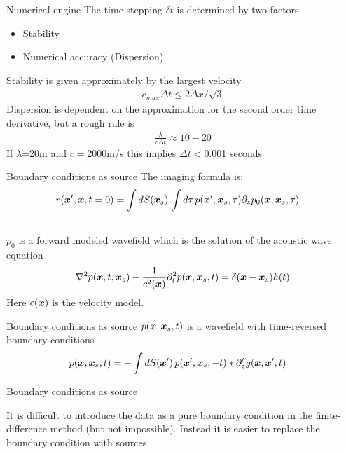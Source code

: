\documentclass[xcolor=dvipsnames,notes]{beamer}
\begin{document}
\begin{frame}{Numerical engine}
The time stepping $\delta t$ is determined by two factors
\begin{itemize}
  \item Stability
  \item Numerical accuracy (Dispersion)
\end{itemize}
Stability is given approximately by the largest velocity
\begin{eqnarray}
c_{max} \Delta t \le 2\Delta x/\sqrt{3}
\end{eqnarray}
Dispersion is dependent on the approximation for the second order time derivative,
but a rough rule is 
\begin{eqnarray}
\frac{\lambda}{c\Delta t} \approx 10-20
\end{eqnarray}
If $\lambda$=20m and $c=$2000m/s this
implies $\Delta t < $0.001 seconds
\end{frame}
\begin{frame}{Boundary conditions as source}
The imaging formula is:
\begin{eqnarray}
 r(\mbox{\boldmath $x$}',\mbox{\boldmath $x$},t=0)=
\int dS(\mbox{\boldmath $x$}_s)\, \int d\tau\, p(\mbox{\boldmath $x$}',\mbox{\boldmath $x$}_s,\tau)\partial_z p_0(\mbox{\boldmath $x$},\mbox{\boldmath $x$}_s,\tau)\nonumber\\
&&                   \label{eq:10600}
\end{eqnarray}
$p_0$ is a forward modeled wavefield which is the solution of the acoustic
wave equation
\begin{eqnarray}
\nabla^2 p(\mbox{\boldmath $x$},t,\mbox{\boldmath $x$}_s) - \frac{1}{c^2(\mbox{\boldmath $x$})} \partial^2_t p(\mbox{\boldmath $x$},\mbox{\boldmath $x$}_s,t) = \delta(\mbox{\boldmath $x$}-\mbox{\boldmath $x$}_s)h(t)
\end{eqnarray}
Here $c(\mbox{\boldmath $x$})$ is the velocity model.
\end{frame}
\begin{frame}{Boundary conditions as source}
$p(\mbox{\boldmath $x$},\mbox{\boldmath $x$}_s,t)$ is a wavefield with time-reversed boundary conditions
\begin{eqnarray}
p(\mbox{\boldmath $x$},\mbox{\boldmath $x$}_s,t) =
-\int dS(\mbox{\boldmath $x$}')\, p(\mbox{\boldmath $x$}',\mbox{\boldmath $x$}_s,-t)*\partial_z' g(\mbox{\boldmath $x$},\mbox{\boldmath $x$}',t)
&&                   \label{eq:1000}
\end{eqnarray}
\end{frame}
\begin{frame}{Boundary conditions as source}
It is difficult to introduce the data as a pure boundary condition in 
the finite-difference method (but not impossible). Instead it is easier
to replace the boundary condition with sources.
\end{frame}
\end{document}
